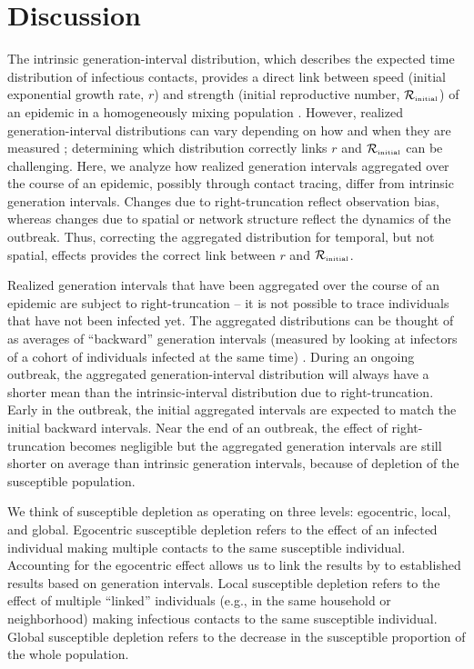 \documentclass[12pt]{article}
\newcommand{\Rx}[1]{\ensuremath{{\mathcal R}_{#1}}\xspace}
\newcommand{\Rini}{\Rx{\textrm{\tiny initial}}}
\begin{document}
\section{Discussion}

The intrinsic generation-interval distribution, which describes the expected time distribution of infectious contacts, provides a direct link between speed (initial exponential growth rate, $r$) and strength (initial reproductive number, $\Rini$) of an epidemic in a homogeneously mixing population \citep{wallinga2007generation, svensson2007note, svensson2015influence, park2019practical}.
However, realized generation-interval distributions can vary depending on how and when they are measured \citep{nishiura2010time, tomba2010some, champredon2015intrinsic, britton2019estimation};
determining which distribution correctly links $r$ and $\Rini$ can be challenging.
Here, we analyze how realized generation intervals aggregated over the course of an epidemic, possibly through contact tracing, differ from intrinsic generation intervals.
Changes due to right-truncation reflect observation bias, whereas changes due to spatial or network structure reflect the dynamics of the outbreak.
Thus, correcting the aggregated distribution for temporal, but not spatial, effects provides the correct link between $r$ and $\Rini$.

Realized generation intervals that have been aggregated over the course of an epidemic are subject to right-truncation -- it is not possible to trace individuals that have not been infected yet.
The aggregated distributions can be thought of as averages of ``backward'' generation intervals (measured by looking at infectors of a cohort of individuals infected at the same time) \citep{champredon2015intrinsic, kenah2008generation, nishiura2010time, tomba2010some, britton2019estimation}.
During an ongoing outbreak, the aggregated generation-interval distribution will always have a shorter mean than the intrinsic-interval distribution due to right-truncation.
Early in the outbreak, the initial aggregated intervals are expected to match the initial backward intervals.
Near the end of an outbreak, the effect of right-truncation becomes negligible but the aggregated generation intervals are still shorter on average than intrinsic generation intervals, because of depletion of the susceptible population.

We think of susceptible depletion as operating on three levels: egocentric, local, and global.
Egocentric susceptible depletion refers to the effect of an infected individual making multiple contacts to the same susceptible individual.
Accounting for the egocentric effect allows us to link the results by \cite{trapman2016inferring} to established results based on generation intervals.
Local susceptible depletion refers to the effect of multiple ``linked'' individuals (e.g., in the same household or neighborhood) making infectious contacts to the same susceptible individual.
Global susceptible depletion refers to the decrease in the susceptible proportion of the whole population.
\end{document}
